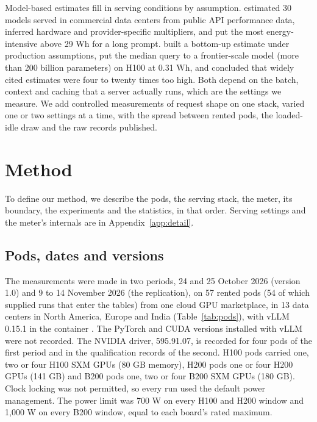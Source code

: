 \documentclass[11pt]{article}
\begin{document}
Model-based estimates fill in serving conditions by assumption. \citet{jegham2025hungry} estimated 30 models served in commercial data centers from public API performance data, inferred hardware and provider-specific multipliers, and put the most energy-intensive above 29 Wh for a long prompt. \citet{oviedo2026energy} built a bottom-up estimate under production assumptions, put the median query to a frontier-scale model (more than 200 billion parameters) on H100 at 0.31 Wh, and concluded that widely cited estimates were four to twenty times too high. Both depend on the batch, context and caching that a server actually runs, which are the settings we measure. We add controlled measurements of request shape on one stack, varied one or two settings at a time, with the spread between rented pods, the loaded-idle draw and the raw records published.

\section{Method}\label{sec:method}

To define our method, we describe the pods, the serving stack, the meter, its boundary, the experiments and the statistics, in that order. Serving settings and the meter's internals are in Appendix~\ref{app:detail}.

\subsection{Pods, dates and versions}\label{sec:method_pods}

The measurements were made in two periods, 24 and 25 October 2026 (version 1.0) and 9 to 14 November 2026 (the replication), on 57 rented pods (54 of which supplied runs that enter the tables) from one cloud GPU marketplace, in 13 data centers in North America, Europe and India (Table~\ref{tab:pods}), with vLLM 0.15.1 in the container . The PyTorch and CUDA versions installed with vLLM were not recorded. The NVIDIA driver, 595.91.07, is recorded for four pods of the first period and in the qualification records of the second. H100 pods carried one, two or four H100 SXM GPUs (80 GB memory), H200 pods one or four H200 GPUs (141 GB) and B200 pods one, two or four B200 SXM GPUs (180 GB). Clock locking was not permitted, so every run used the default power management. The power limit was 700 W on every H100 and H200 window and 1,000 W on every B200 window, equal to each board's rated maximum.
\end{document}
